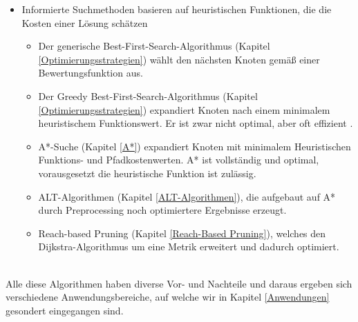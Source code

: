 \begin{itemize}
\begin{itemize}
    \end{itemize}
    \item Informierte Suchmethoden basieren auf heuristischen Funktionen, die die Kosten einer Lösung schätzen
    \begin{itemize}
        \item Der generische Best-First-Search-Algorithmus (Kapitel \ref{Optimierungsstrategien}) wählt den nächsten Knoten gemäß einer Bewertungsfunktion aus.
        \item Der Greedy Best-First-Search-Algorithmus (Kapitel \ref{Optimierungsstrategien}) expandiert Knoten nach einem minimalem heuristischem Funktionswert. Er ist zwar nicht optimal, aber oft effizient \cite[108,109]{Russell:10}.
        \item A*-Suche (Kapitel \ref{A*}) expandiert Knoten mit minimalem Heuristischen Funktions- und Pfadkostenwerten. A* ist vollständig und optimal, vorausgesetzt die heuristische Funktion ist zulässig.
        \item ALT-Algorithmen (Kapitel \ref{ALT-Algorithmen}), die aufgebaut auf A* durch Preprocessing noch optimiertere Ergebnisse erzeugt.
        \item Reach-based Pruning (Kapitel \ref{Reach-Based Pruning}), welches den Dijkstra-Algorithmus um eine Metrik erweitert und dadurch optimiert.
    \end{itemize}
\end{itemize}
\noindent \\
Alle diese Algorithmen haben diverse Vor- und Nachteile und daraus ergeben sich verschiedene 
Anwendungsbereiche, auf welche wir in Kapitel \ref{Anwendungen} gesondert eingegangen sind.

